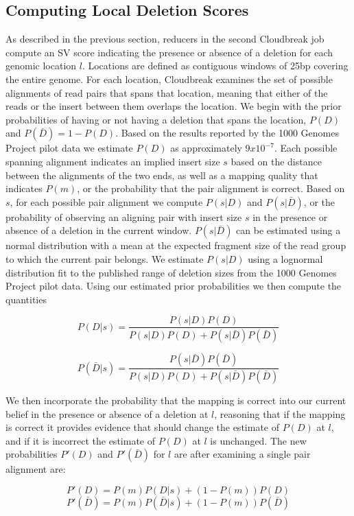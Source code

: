 \documentclass[12pt]{article}
\begin{document}
\subsection{Computing Local Deletion Scores}

As described in the previous section, reducers in the second Cloudbreak job compute an SV score indicating the presence or absence of a deletion for each genomic location $l$. Locations are defined as contiguous windows of 25bp covering the entire genome. For each location, Cloudbreak examines the set of possible alignments of read pairs that spans that location, meaning that either of the reads or the insert between them overlaps the location. We begin with the prior probabilities of having or not having a deletion that spans the location, $P(D)$ and $P(\bar{D}) = 1 - P(D)$. Based on the results reported by the 1000 Genomes Project pilot data \cite{Mills:2011p1611} we estimate $P(D)$ as approximately $9x10^{-7}$. Each possible spanning alignment indicates an implied insert size $s$ based on the distance between the alignments of the two ends, as well as a mapping quality that indicates $P(m)$, or the probability that the pair alignment is correct. Based on $s$, for each possible pair alignment we compute $P(s|D)$ and $P(s|\bar{D})$, or the probability of observing an aligning pair with insert size $s$ in the presence or absence of a deletion in the current window. $P(s|{\bar{D}})$ can be estimated using a normal distribution with a mean at the expected fragment size of the read group to which the current pair belongs. We estimate $P(s|D)$ using a lognormal distribution fit to the published range of deletion sizes from the 1000 Genomes Project pilot data. Using our estimated prior probabilities we then compute the quantities

\[ 
P(D|s) = \frac{P(s|D)P(D)} {P(s|D)P(D) + P(s|\bar{D})P(\bar{D})}
\]

\[ 
P(\bar{D}|s) = \frac{P(s|\bar{D})P(\bar{D})}{P(s|D)P(D) + P(s|\bar{D})P(\bar{D})} 
\]

We then incorporate the probability that the mapping is correct into our current belief in the presence or absence of a deletion at $l$, reasoning that if the mapping is correct it provides evidence that should change the estimate of $P(D)$ at $l$, and if it is incorrect the estimate of $P(D)$ at $l$ is unchanged. The new probabilities $P'(D)$ and $P'(\bar{D})$ for $l$ are after examining a single pair alignment are:

\[ P'(D) = P(m)P(D|s) + (1 - P(m))P(D) \]
\[ P'(\bar{D}) = P(m)P(\bar{D}|s) + (1 - P(m))P(\bar{D}) \]
\end{document}
